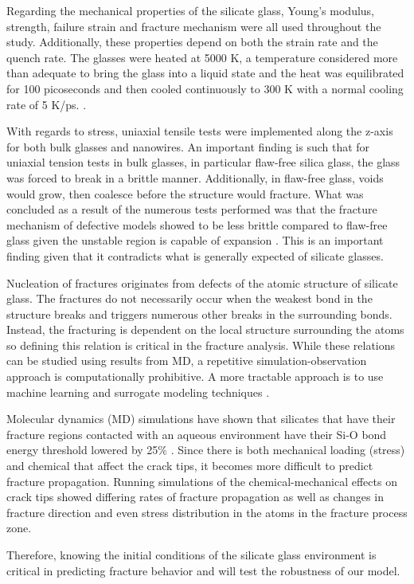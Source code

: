 \begin{itemize}
Regarding the mechanical properties of the silicate glass, Young's modulus, strength, failure strain and fracture mechanism were all used throughout the study.  Additionally, these properties depend on both the strain rate and the quench rate. The glasses were heated at 5000 K, a temperature considered more than adequate to bring the glass into a liquid state and the heat was equilibrated for 100 picoseconds and then cooled continuously to 300 K with a normal cooling rate of 5 K/ps. .

With regards to stress, uniaxial tensile tests were implemented along the z-axis for both bulk glasses and nanowires. An important finding is such that for uniaxial tension tests in bulk glasses, in particular flaw-free silica glass, the glass was forced to break in a brittle manner. Additionally, in flaw-free glass, voids would grow, then coalesce before the structure would fracture. What was concluded as a result of the numerous tests performed was that the fracture mechanism of defective models showed to be less brittle compared to flaw-free glass given the unstable region is capable of expansion . This is an important finding given that it contradicts what is generally expected of silicate glasses\cite{radialDistribution}.

Nucleation of fractures originates from defects of the atomic structure of silicate glass. 
The fractures do not necessarily occur when the weakest bond in the structure breaks and triggers numerous other breaks in the surrounding bonds. Instead, the fracturing is dependent on the local structure surrounding the atoms so defining this relation is critical in the fracture analysis. While these relations can be studied using results from MD, a repetitive simulation-observation approach is computationally prohibitive. A more tractable approach is to use machine learning and surrogate modeling techniques \cite{TopSystem} \cite{MLACrack} \cite{bauchy}. 

Molecular dynamics (MD) simulations have shown that silicates that have their fracture regions contacted with an aqueous environment have their Si-O bond energy threshold lowered by 25$\%$  \cite{chem_effects}. Since there is both mechanical loading (stress) and chemical that affect the crack tips, it becomes more difficult to predict fracture propagation. Running simulations of the chemical-mechanical effects on crack tips showed differing rates of fracture propagation as well as changes in fracture direction and even stress distribution in the atoms in the fracture process zone. 

Therefore, knowing the initial conditions of the silicate glass environment is critical in predicting fracture behavior and  will test the robustness of our model.
\end{itemize}


